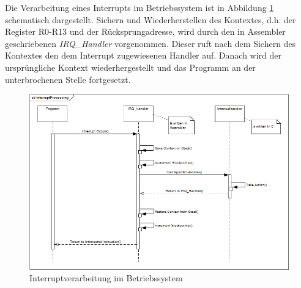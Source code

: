 Die Verarbeitung eines Interrupts im Betriebssystem ist in Abbildung \ref{fig:interruptProcessing} schematisch dargestellt. Sichern und Wiederherstellen des Kontextes, d.h. der Register R0-R13 und der Rücksprungadresse, wird durch den in Assembler geschriebenen \emph{IRQ\_Handler} vorgenommen. Dieser ruft nach dem Sichern des Kontextes den dem Interrupt zugewiesenen Handler auf. Danach wird der ursprüngliche Kontext wiederhergestellt und das Programm an der unterbrochenen Stelle fortgesetzt.


\begin{figure}[H]
	\includegraphics[scale=0.55]{chapters/hal/figures/InterruptProcessing}
	\caption{Interruptverarbeitung im Betriebssystem}
	\label{fig:interruptProcessing}
\end{figure}
\pagebreak 